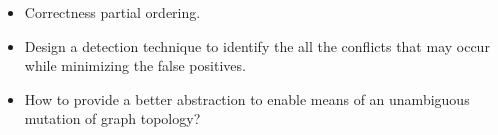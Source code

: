\begin{frame}
\begin{itemize}
  \item Correctness partial ordering.
  \linebreak
  \item Design a detection technique to identify the all the conflicts that may occur while minimizing the false positives.
  \linebreak
  \item How to provide a better abstraction to enable means of an unambiguous mutation of graph topology?
\end{itemize}
\end{frame}

